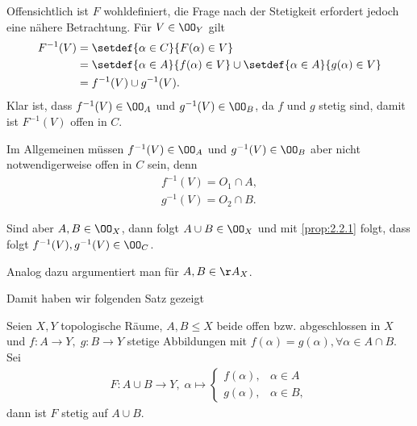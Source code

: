 Offensichtlich ist $F$ wohldefiniert, die Frage nach der Stetigkeit erfordert
jedoch eine nähere Betrachtung. Für $V\in\OO_Y$ gilt
\begin{align*}
F^{-1}(V) &= \setdef{\alpha\in C}{F(\alpha)\in V}
\\ &= \setdef{\alpha\in A}{f(\alpha)\in V}\cup
\setdef{\alpha\in A}{g(\alpha)\in V}
\\ &= f^{-1}(V)\cup g^{-1}(V).
\end{align*}
Klar ist, dass $f^{-1}(V)\in\OO_A$ und $g^{-1}(V)\in\OO_B$, da $f$ und $g$
stetig sind, damit ist $F^{-1}(V)$ offen in $C$.

Im Allgemeinen müssen $f^{-1}(V)\in\OO_A$ und $g^{-1}(V)\in\OO_B$ aber nicht
notwendigerweise offen in $C$ sein, denn
\begin{align*}
f^{-1}(V) = O_1\cap A,\\
g^{-1}(V) = O_2\cap B.
\end{align*}

Sind aber $A,B\in\OO_X$, dann folgt $A\cup B\in\OO_X$ und mit \ref{prop:2.2.1}
folgt, dass folgt $f^{-1}(V),g^{-1}(V)\in\OO_C$.

Analog dazu argumentiert man für $A,B\in\AA_X$.

Damit haben wir folgenden Satz gezeigt
\begin{prop}
\label{prop:2.2.20}
Seien $X,Y$ topologische Räume, $A,B\le X$ beide offen bzw.
abgeschlossen in $X$ und $f: A\to Y,\;g: B\to Y$ stetige Abbildungen mit
$f(\alpha)=g(\alpha), \forall\alpha\in A\cap B$. Sei
\begin{align*}
F: A\cup B \to Y,\; \alpha\mapsto\begin{cases}
                                 f(\alpha),& \alpha\in A\\
                                 g(\alpha),& \alpha\in B,
                                 \end{cases}
\end{align*}
dann ist $F$ stetig auf $A\cup B$.\fishhere
\end{prop}


